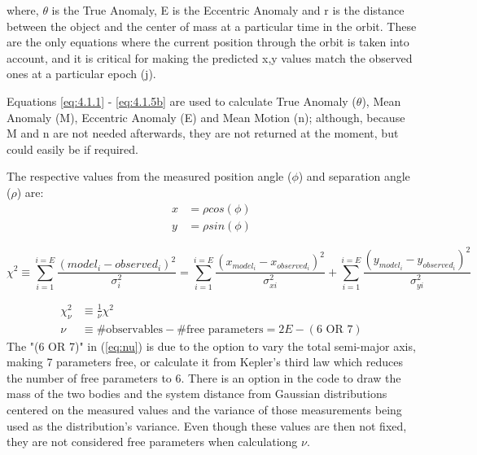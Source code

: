 \documentclass[10pt,preprint]{aastex}
\begin{document}
where, $\theta$ is the True Anomaly, E is the Eccentric Anomaly and r is the distance between the object and the center of mass at a particular time in the orbit.  These are the only equations where the current position through the orbit is taken into account, and it is critical for making the predicted x,y values match the observed ones at a particular epoch (j).

Equations \ref{eq:4.1.1} - \ref{eq:4.1.5b} are used to calculate True Anomaly ($\theta$), Mean Anomaly (M), Eccentric Anomaly (E) and Mean Motion (n); although, because M and n are not needed afterwards, they are not returned at the moment, but could easily be if required.

The respective values from the measured position angle ($\phi$) and separation angle ($\rho$) are:
\begin{subequations}
\begin{align}\label{eq:28-2a}
x& = \rho cos(\phi)\\
\label{eq:28-2b}
y& = \rho sin(\phi)
\end{align}
\end{subequations}

\begin{equation}\label{eq:33}
\chi^{2} \equiv  \sum_{i=1}^{i=E} \frac{(model_i - observed_i)^{2}}{\sigma^{2}_i} = \sum_{i=1}^{i=E} \frac{(x_{model_i}-x_{observed_i}) ^{2}}{\sigma^{2}_{xi}} +\sum_{i=1}^{i=E} \frac{(y_{model_i}-y_{observed_i}) ^{2}}{\sigma^{2}_{yi}}
\end{equation}

\begin{subequations}
\begin{align}\label{eq:reducedChiSquare}
\chi^{2}_{\nu}& \equiv \frac{1}{\nu}\chi^{2}\\
\label{eq:nu}
\nu& \equiv \#\text{observables}-\#\text{free parameters}=2E-(\text{6 OR 7})
\end{align}
\end{subequations}
The "(6 OR 7)" in (\ref{eq:nu}) is due to the option to vary the total semi-major axis, making 7 parameters free, or calculate it from Kepler's third law which reduces the number of free parameters to 6.  There is an option in the code to draw the mass of the two bodies and the system distance from Gaussian distributions centered on the measured values and the variance of those measurements being used as the distribution's variance.  Even though these values are then not fixed, they are not considered free parameters when calculationg $\nu$.
\pagebreak
\end{document}
